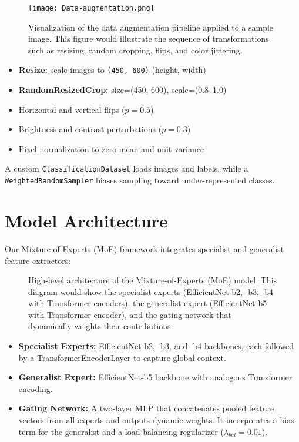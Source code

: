 \begin{figure}[h!]
  \centering
\texttt{[image: Data-augmentation.png]}
  \caption{Visualization of the data augmentation pipeline applied to a sample image. This figure would illustrate the sequence of transformations such as resizing, random cropping, flips, and color jittering.}
  \label{fig:data-augmentation-pipeline}
\end{figure}

\begin{itemize}
\item \textbf{Resize:} scale images to \texttt{(450, 600)} (height, width)
\item \textbf{RandomResizedCrop:} size=(450, 600), scale=(0.8--1.0)
\item Horizontal and vertical flips ($p=0.5$)
\item Brightness and contrast perturbations ($p=0.3$)
\item Pixel normalization to zero mean and unit variance
\end{itemize}
A custom \texttt{ClassificationDataset} loads images and labels, while a \texttt{WeightedRandomSampler} biases sampling toward under-represented classes.

\section{Model Architecture}
Our Mixture-of-Experts (MoE) framework integrates specialist and generalist feature extractors:

\begin{figure}[h!]
  \centering
  \caption{High-level architecture of the Mixture-of-Experts (MoE) model. This diagram would show the specialist experts (EfficientNet-b2, -b3, -b4 with Transformer encoders), the generalist expert (EfficientNet-b5 with Transformer encoder), and the gating network that dynamically weights their contributions.}
  \label{fig:model-architecture}
\end{figure}

\begin{itemize}
\item \textbf{Specialist Experts:} EfficientNet-b2, -b3, and -b4 backbones, each followed by a TransformerEncoderLayer to capture global context.
\item \textbf{Generalist Expert:} EfficientNet-b5 backbone with analogous Transformer encoding.
\item \textbf{Gating Network:} A two-layer MLP that concatenates pooled feature vectors from all experts and outputs dynamic weights. It incorporates a bias term for the generalist and a load-balancing regularizer ($\lambda_{bal}=0.01$).
\end{itemize}

